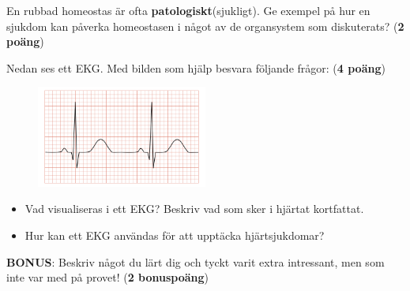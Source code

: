 \documentclass{exam}
\begin{document}
\begin{questions}
\question
En rubbad homeostas är ofta \textbf{patologiskt}(sjukligt). Ge exempel på hur en sjukdom kan påverka homeostasen i något av de organsystem som diskuterats? (\textbf{2 poäng})

\vspace{40mm}
\break

\question Nedan ses ett EKG. Med bilden som hjälp besvara följande frågor: (\textbf{4 poäng})
\begin{figure}[h]
\centering
\includegraphics[width=0.5\textwidth]{EKG.png}
\end{figure}

\begin{itemize}
    \item Vad visualiseras i ett EKG? Beskriv vad som sker i hjärtat kortfattat.
    \item Hur kan ett EKG användas för att upptäcka hjärtsjukdomar?
\end{itemize}
\vspace{80mm}

\question \textbf{BONUS}: Beskriv något du lärt dig och tyckt varit extra intressant, men som inte var med på provet! (\textbf{2 bonuspoäng})

\end{questions}
\end{document}
